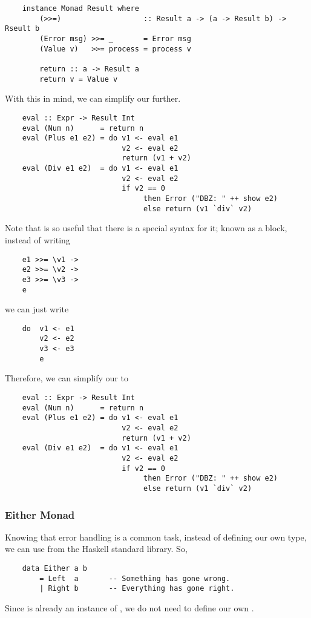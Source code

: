 \documentclass[letterpaper]{article}
\begin{document}
\begin{verbatim}
    instance Monad Result where 
        (>>=)                   :: Result a -> (a -> Result b) -> Rseult b 
        (Error msg) >>= _       = Error msg
        (Value v)   >>= process = process v
        
        return :: a -> Result a
        return v = Value v\end{verbatim}

With this in mind, we can simplify our  further.
\begin{verbatim}
    eval :: Expr -> Result Int
    eval (Num n)      = return n
    eval (Plus e1 e2) = do v1 <- eval e1
                           v2 <- eval e2
                           return (v1 + v2)
    eval (Div e1 e2)  = do v1 <- eval e1
                           v2 <- eval e2
                           if v2 == 0
                                then Error ("DBZ: " ++ show e2)
                                else return (v1 `div` v2)\end{verbatim}
Note that \code{>>=} is so useful that there is a special syntax for it; known as a  block, instead of writing 
\begin{verbatim}
    e1 >>= \v1 ->
    e2 >>= \v2 ->
    e3 >>= \v3 ->
    e\end{verbatim}
we can just write 
\begin{verbatim}
    do  v1 <- e1 
        v2 <- e2 
        v3 <- e3 
        e\end{verbatim}
Therefore, we can simplify our  to 
\begin{verbatim}
    eval :: Expr -> Result Int
    eval (Num n)      = return n
    eval (Plus e1 e2) = do v1 <- eval e1
                           v2 <- eval e2
                           return (v1 + v2)
    eval (Div e1 e2)  = do v1 <- eval e1
                           v2 <- eval e2
                           if v2 == 0
                                then Error ("DBZ: " ++ show e2)
                                else return (v1 `div` v2)\end{verbatim}
\subsubsection{Either Monad}
Knowing that error handling is a common task, instead of defining our own  type, we can use  from the Haskell standard library. So, 
\begin{verbatim}
    data Either a b
        = Left  a       -- Something has gone wrong. 
        | Right b       -- Everything has gone right. \end{verbatim}
Since  is already an instance of , we do not need to define our own \code{>>=}.
\end{document}
